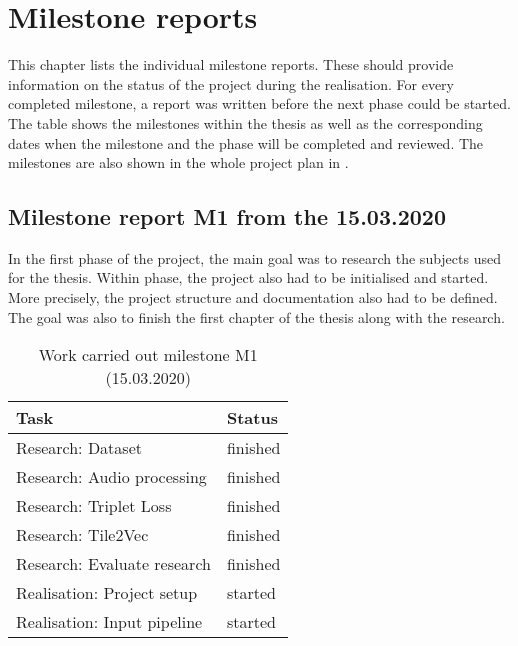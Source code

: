 \chapter{Milestone reports}
\label{app:Milestone-Reports}
This chapter lists the individual milestone reports. These should provide information on the status of the project during the realisation. For every completed milestone, a report was written before the next phase could be started. The table  shows the milestones within the thesis as well as the corresponding dates when the milestone and the phase will be completed and reviewed. The milestones are also shown in the whole project plan in .

\section{Milestone report M1 from the 15.03.2020}
In the first phase of the project, the main goal was to research the subjects used for the thesis. Within phase, the project also had to be initialised and started. More precisely, the project structure and documentation also had to be defined. The goal was also to finish the first chapter of the thesis  along with the research.

\begin{table}[htbp]
    \centering
    \caption{Work carried out milestone M1 (15.03.2020)}
	\label{tab:Work-Carried-Out-M1}
    \begin{tabular}{p{} | p{}}
        \toprule
        \textbf{Task} & \textbf{Status} \\ 
        \midrule[1pt]
        Research: Dataset & finished \\
        \hline
        Research: Audio processing & finished \\
        \hline
        Research: Triplet Loss & finished \\
        \hline
        Research: Tile2Vec & finished \\
        \hline
        Research: Evaluate research & finished \\
        \hline
        Realisation: Project setup & started \\
        \hline
        Realisation: Input pipeline & started \\
        \bottomrule
    \end{tabular}
\end{table}

